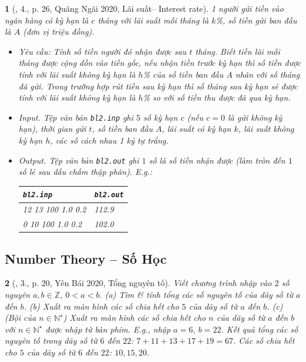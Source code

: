\documentclass{article}
\newtheorem{baitoan}{}
\begin{document}
\begin{baitoan}[\cite{VietSTEM2021}, 4., p. 26, Quãng Ngãi 2020, Lãi suất-- Interest rate]
	1 người gửi tiền vào ngân hàng có kỳ hạn là $c$ tháng với lãi suất mỗi tháng là $k$\emph{\%}, số tiền gửi ban đầu là $A$ (đơn vị triệu đồng). 
	\begin{itemize}
		\item {\sf Yêu cầu:} Tính số tiền người đó nhận được sau $t$ tháng. Biết tiền lãi mỗi tháng được cộng dồn vào tiền gốc, nếu nhận tiền trước kỳ hạn thì số tiền được tính với lãi suất không kỳ hạn là $h$\emph{\%} của số tiền ban đầu $A$ nhân với số tháng đã gửi. Trong trường hợp rút tiền sau kỳ hạn thì số tháng sau kỳ hạn sẽ được tính với lãi suất không kỳ hạn là $h$\emph{\%} so với số tiền thu được đã qua kỳ hạn.
		\item {\sf Input.} Tệp văn bản \verb|bl2.inp| ghi $5$ số kỳ hạn $c$ (nếu $c = 0$ là gửi không kỳ hạn), thời gian gửi $t$, số tiền ban đầu $A$, lãi suất có kỳ hạn $k$, lãi suất không kỳ hạn $h$, các số cách nhau 1 ký tự trắng.
		\item {\sf Output.} Tệp văn bản \verb|bl2.out| ghi $1$ số là số tiền nhận được (làm tròn đến $1$ số lẻ sau dấu chấm thập phân). E.g.:
		\begin{table}[H]
			\centering
			\begin{tabular}{|l|l|}
				\hline
				{\tt bl2.inp} & {\tt bl2.out} \\
				\hline
				12 13 100 1.0 0.2 & 112.9 \\
				\hline
				0 10 100 1.0 0.2 & 102.0 \\
				\hline
			\end{tabular}
		\end{table}
	\end{itemize}
\end{baitoan}


\subsection{Number Theory -- Số Học}

\begin{baitoan}[\cite{VietSTEM2021}, 3., p. 20, Yên Bái 2020, Tổng nguyên tố]
	Viết chương trình nhập vào $2$ số nguyên $a,b\in\mathbb{Z}$, $0 < a < b$. (a) Tìm \& tính tổng các số nguyên tố của dãy số từ $a$ đến $b$. (b) Xuất ra màn hình các số chia hết cho $5$ của dãy số từ $a$ đến $b$. (c) \emph{(Bội của $n\in\mathbb{N}^\star$)} Xuất ra màn hình các số chia hết cho $n$ của dãy số từ $a$ đến $b$ với $n\in\mathbb{N}^\star$ được nhập từ bàn phím. E.g., nhập $a = 6$, $b = 22$. Kết quả tổng các số nguyên tố trong dãy số từ $6$ đến $22$: $7 + 11 + 13 + 17 + 19 = 67$. Các số chia hết cho $5$ của dãy số từ $6$ đến $22$: $10,15,20$.
\end{baitoan}
\end{document}
